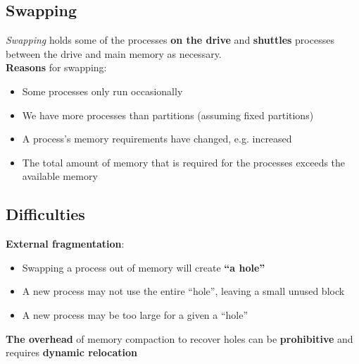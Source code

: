 \documentclass{article}
\begin{document}
\subsection{Swapping}
\begin{flushleft}
\textit{Swapping} holds some of the processes \textbf{on the drive} and \textbf{shuttles} processes between the drive and main memory as necessary.\\
\textbf{Reasons} for swapping:
\begin{itemize}
	\item Some processes only run occasionally
	\item We have more processes than partitions (assuming fixed partitions)
	\item A process’s memory requirements have changed, e.g. increased
	\item The total amount of memory that is required for the processes exceeds the available memory
\end{itemize}
\end{flushleft}

\subsection{Difficulties}
\begin{flushleft}
\textbf{External fragmentation}:
\begin{itemize}
	\item Swapping a process out of memory will create \textbf{“a hole”}
	\item A new process may not use the entire “hole”, leaving a small unused block
	\item A new process may be too large for a given a “hole”
\end{itemize}
\textbf{The overhead} of memory compaction to recover holes can be \textbf{prohibitive} and requires \textbf{dynamic relocation}
\end{flushleft}
\end{document}
